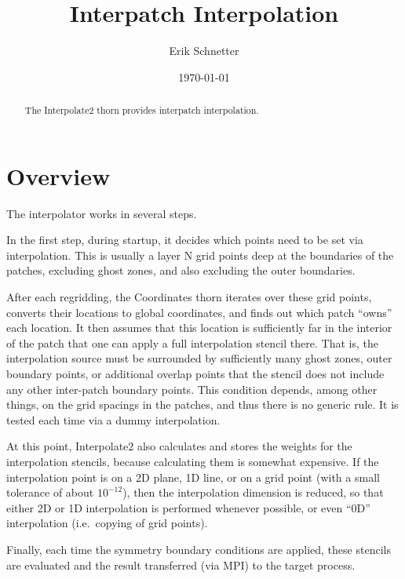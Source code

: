 \documentclass{article}
\begin{document}
\author{Erik Schnetter}
\title{Interpatch Interpolation}

\date{\today}

\maketitle


\begin{abstract}
The Interpolate2 thorn provides interpatch interpolation.
\end{abstract}

\section{Overview}

The interpolator works in several steps.

In the first step, during startup, it decides which points need to be
set via interpolation. This is usually a layer N grid points deep at
the boundaries of the patches, excluding ghost zones, and also
excluding the outer boundaries.

After each regridding, the Coordinates thorn iterates over these grid points, converts
their locations to global coordinates, and finds out which patch ``owns''
each location. It then assumes that this location is sufficiently far
in the interior of the patch that one can apply a full interpolation
stencil there. That is, the interpolation source must be surrounded by
sufficiently many ghost zones, outer boundary points, or additional
overlap points that the stencil does not include any other inter-patch
boundary points. This condition depends, among other things, on the
grid spacings in the patches, and thus there is no generic rule. It is
tested each time via a dummy interpolation.

At this point, Interpolate2 also calculates and stores the weights for the
interpolation stencils, because calculating them is somewhat
expensive. If the interpolation point is on a 2D plane, 1D line, or on
a grid point (with a small tolerance of about $10^{-12}$), then the
interpolation dimension is reduced, so that either 2D or 1D
interpolation is performed whenever possible, or even ``0D''
interpolation (i.e.~copying of grid points).

Finally, each time the symmetry boundary conditions are applied, these
stencils are evaluated and the result transferred (via MPI) to the
target process.
\end{document}
